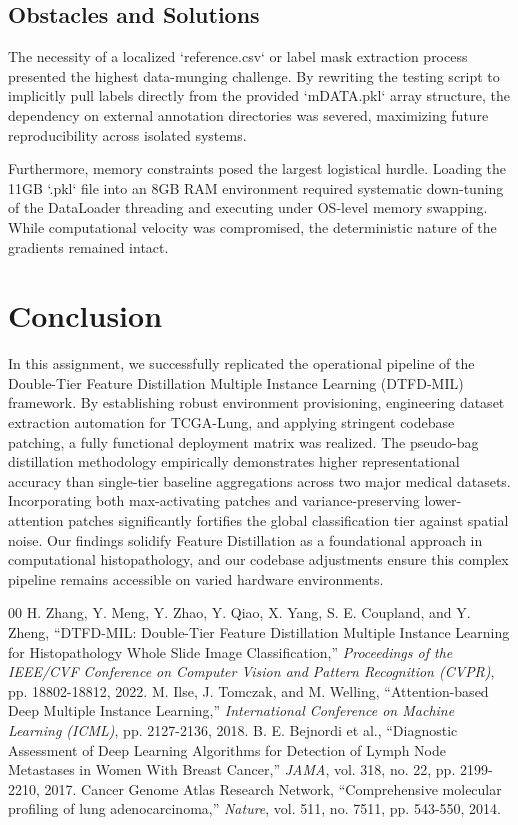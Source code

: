 \documentclass[11pt,a4paper]{article}
\begin{document}
\subsection{Obstacles and Solutions}
The necessity of a localized `reference.csv` or label mask extraction process presented the highest data-munging challenge. By rewriting the testing script to implicitly pull labels directly from the provided `mDATA.pkl` array structure, the dependency on external annotation directories was severed, maximizing future reproducibility across isolated systems. 

Furthermore, memory constraints posed the largest logistical hurdle. Loading the 11GB `.pkl` file into an 8GB RAM environment required systematic down-tuning of the DataLoader threading and executing under OS-level memory swapping. While computational velocity was compromised, the deterministic nature of the gradients remained intact.

\section{Conclusion}
In this assignment, we successfully replicated the operational pipeline of the Double-Tier Feature Distillation Multiple Instance Learning (DTFD-MIL) framework. By establishing robust environment provisioning, engineering dataset extraction automation for TCGA-Lung, and applying stringent codebase patching, a fully functional deployment matrix was realized. The pseudo-bag distillation methodology empirically demonstrates higher representational accuracy than single-tier baseline aggregations across two major medical datasets. Incorporating both max-activating patches and variance-preserving lower-attention patches significantly fortifies the global classification tier against spatial noise. Our findings solidify Feature Distillation as a foundational approach in computational histopathology, and our codebase adjustments ensure this complex pipeline remains accessible on varied hardware environments.

\begin{thebibliography}{00}
 H. Zhang, Y. Meng, Y. Zhao, Y. Qiao, X. Yang, S. E. Coupland, and Y. Zheng, ``DTFD-MIL: Double-Tier Feature Distillation Multiple Instance Learning for Histopathology Whole Slide Image Classification,'' \textit{Proceedings of the IEEE/CVF Conference on Computer Vision and Pattern Recognition (CVPR)}, pp. 18802-18812, 2022.
 M. Ilse, J. Tomczak, and M. Welling, ``Attention-based Deep Multiple Instance Learning,'' \textit{International Conference on Machine Learning (ICML)}, pp. 2127-2136, 2018.
 B. E. Bejnordi et al., ``Diagnostic Assessment of Deep Learning Algorithms for Detection of Lymph Node Metastases in Women With Breast Cancer,'' \textit{JAMA}, vol. 318, no. 22, pp. 2199-2210, 2017.
 Cancer Genome Atlas Research Network, ``Comprehensive molecular profiling of lung adenocarcinoma,'' \textit{Nature}, vol. 511, no. 7511, pp. 543-550, 2014.
\end{thebibliography}
\end{document}
